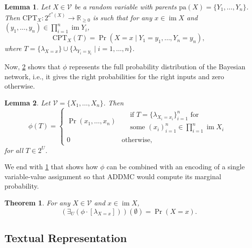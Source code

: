 \documentclass[accepted]{uai2021}
\newtheorem{theorem}{Theorem}
\newtheorem{lemma}{Lemma}
\theoremstyle{definition}
\DeclareMathOperator{\im}{im}
\begin{document}
\begin{lemma} \label{lemma:cpt}
  Let $X \in \mathcal{V}$ be a random variable with parents $\mathrm{pa}(X) = \{ Y_1,
  \dots, Y_n \}$. Then $\mathrm{CPT}_X\colon 2^{\mathcal{E}^*(X)} \to
  \mathbb{R}_{\ge 0}$ is such that for any $x \in \im X$ and $(y_1, \dots, y_n)
  \in \prod_{i=1}^n \im Y_i$,
  \[
    \mathrm{CPT}_X (T) = \Pr(X = x \mid Y_1 = y_1, \dots, Y_n = y_n),
  \]
  where $T = \{ \lambda_{X=x} \} \cup \{ \lambda_{Y_i=y_i} \mid i = 1, \dots, n
  \}$.
\end{lemma}

Now, \cref{lemma:full_distribution} shows that $\phi$ represents the full
probability distribution of the Bayesian network, i.e., it gives the right
probabilities for the right inputs and zero otherwise. 

\begin{lemma} \label{lemma:full_distribution}
  Let $\mathcal{V} = \{X_1, \dots, X_n\}$. Then
  \[
    \phi(T) =
    \begin{cases}
      \Pr(x_1, \dots, x_n) &
      \begin{aligned}
        &\text{if } T = \{ \lambda_{X_i=x_i} \}_{i = 1}^n \text{ for} \\
        &\text{some } \textstyle (x_i)_{i=1}^n \in \prod_{i=1}^n \im X_i
      \end{aligned} \\
      0 & \text{otherwise,}
    \end{cases}
  \]
  for all $T \in 2^U$.
\end{lemma}

We end with \cref{thm:correctness} that shows how $\phi$ can be combined with an
encoding of a single variable-value assignment so that \textsf{ADDMC}
\citep{DBLP:conf/aaai/DudekPV20} would compute its marginal probability.

\begin{theorem} \label{thm:correctness}
  For any $X \in \mathcal{V}$ and $x \in \im X$,
  \[
    (\exists_U(\phi \cdot [\lambda_{X=x}]))(\emptyset) = \Pr(X = x).
  \]
\end{theorem}

\subsection{Textual Representation} \label{sec:textual_representation}
\end{document}
